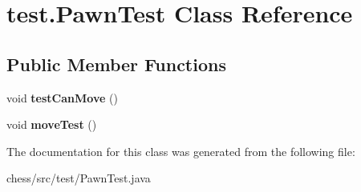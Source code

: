 \hypertarget{classtest_1_1_pawn_test}{}\section{test.\+Pawn\+Test Class Reference}
\label{classtest_1_1_pawn_test}
\subsection*{Public Member Functions}
\begin{DoxyCompactItemize}
\item 
\mbox{\label{classtest_1_1_pawn_test_a743a868ddc07462c7128225c3c3ae001}} 
void {\bfseries test\+Can\+Move} ()
\item 
\mbox{\label{classtest_1_1_pawn_test_add7115a622303690eed683e45ef6f9e4}} 
void {\bfseries move\+Test} ()
\end{DoxyCompactItemize}


The documentation for this class was generated from the following file\+:\begin{DoxyCompactItemize}
\item 
chess/src/test/Pawn\+Test.\+java\end{DoxyCompactItemize}
